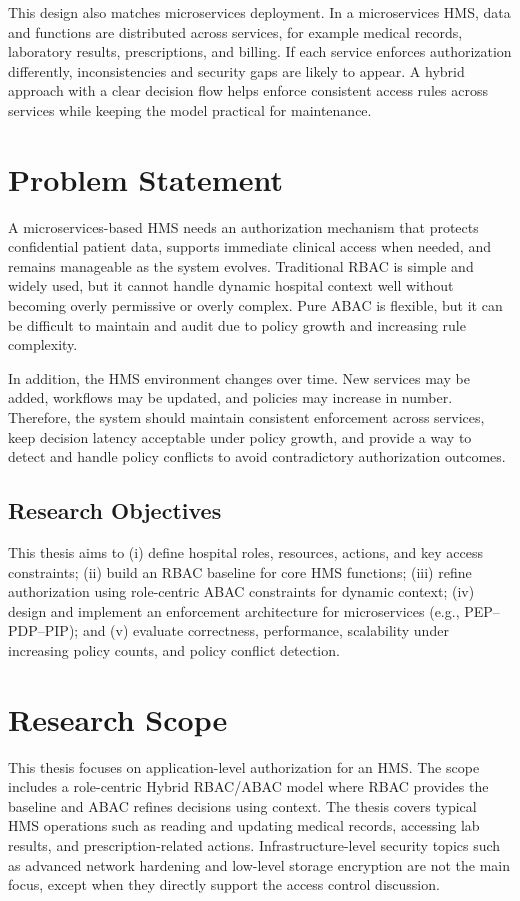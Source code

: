 This design also matches microservices deployment. In a microservices HMS, data and functions are distributed across services, for example medical records, laboratory results, prescriptions, and billing. If each service enforces authorization differently, inconsistencies and security gaps are likely to appear. A hybrid approach with a clear decision flow helps enforce consistent access rules across services while keeping the model practical for maintenance.

\section{Problem Statement}
A microservices-based HMS needs an authorization mechanism that protects confidential patient data, supports immediate clinical access when needed, and remains manageable as the system evolves. Traditional RBAC is simple and widely used, but it cannot handle dynamic hospital context well without becoming overly permissive or overly complex. Pure ABAC is flexible, but it can be difficult to maintain and audit due to policy growth and increasing rule complexity.
\vspace{0.5cm}


In addition, the HMS environment changes over time. New services may be added, workflows may be updated, and policies may increase in number. Therefore, the system should maintain consistent enforcement across services, keep decision latency acceptable under policy growth, and provide a way to detect and handle policy conflicts to avoid contradictory authorization outcomes.

\subsection{Research Objectives}
This thesis aims to (i) define hospital roles, resources, actions, and key access constraints; (ii) build an RBAC baseline for core HMS functions; (iii) refine authorization using role-centric ABAC constraints for dynamic context; (iv) design and implement an enforcement architecture for microservices (e.g., PEP--PDP--PIP); and (v) evaluate correctness, performance, scalability under increasing policy counts, and policy conflict detection.

\section{Research Scope}
This thesis focuses on application-level authorization for an HMS. The scope includes a role-centric Hybrid RBAC/ABAC model where RBAC provides the baseline and ABAC refines decisions using context. The thesis covers typical HMS operations such as reading and updating medical records, accessing lab results, and prescription-related actions. Infrastructure-level security topics such as advanced network hardening and low-level storage encryption are not the main focus, except when they directly support the access control discussion.

